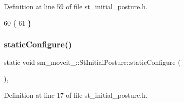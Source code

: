 Definition at line 59 of file st\+\_\+initial\+\_\+posture.\+h.


\begin{DoxyCode}
60     \{
61     \}
\end{DoxyCode}
\mbox{\label{structsm__moveit__2_1_1StInitialPosture_a8db4abf3f19590a671c6a863f68f5c0d}} 
\subsubsection{\texorpdfstring{static\+Configure()}{staticConfigure()}}
{\footnotesize\ttfamily static void sm\+\_\+moveit\+\_\+::\+St\+Initial\+Posture\+::static\+Configure (\begin{DoxyParamCaption}{ }\end{DoxyParamCaption})\hspace{0.3cm}{\ttfamily [inline]}, {\ttfamily [static]}}



Definition at line 17 of file st\+\_\+initial\+\_\+posture.\+h.


